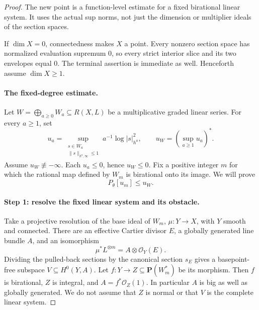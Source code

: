 \begin{proof}

The new point is a function-level estimate for a fixed birational linear
system.  It uses the actual sup norms, not just the dimension or
multiplier ideals of the section spaces.

If \(\dim X=0\), connectedness makes \(X\) a point.  Every nonzero
section space has normalized evaluation supremum \(0\), so every strict
interior slice and its two envelopes equal \(0\).  The terminal assertion
is immediate as well.  Henceforth assume \(\dim X\geq1\).

\paragraph{The fixed-degree estimate.}

Let \(W=\bigoplus_{a\geq0}W_a\subseteq R(X,L)\) be a multiplicative graded
linear series.  For every \(a\geq1\), set
\[
 u_a=\sup_{\substack{s\in W_a\\\|s\|_{h^a,\infty}\leq1}}
                   a^{-1}\log|s|_{h^a}^2,\qquad
 u_W=(\sup_{a\geq1}u_a)^*.
\]
Assume \(u_W\not\equiv-\infty\).  Each \(u_a\leq0\), hence \(u_W\leq0\).
Fix a positive integer \(m\) for which the rational map defined by \(W_m\)
is birational onto its image.  We will prove
\[
\tag{71.48c}\label{eq:pseff-filtration-fixed-degree-bound}
                         P_\theta[u_m]\leq u_W.
\]

\paragraph{Step 1: resolve the fixed linear system and its obstacle.}
Take a projective resolution of the base ideal of \(W_m\),
\(\mu:Y\to X\), with \(Y\) smooth and connected.  There are an effective
Cartier divisor \(E\), a globally generated line bundle \(A\), and an
isomorphism
\[
\tag{71.48d}\label{eq:pseff-filtration-resolved-bundle}
             \mu^*L^{\otimes m}=A\otimes\mathcal O_Y(E).
\]
Dividing the pulled-back sections by the canonical section \(s_E\)
gives a basepoint-free subspace \(V\subseteq H^0(Y,A)\).
Let \(f:Y\to Z\subseteq\mathbf P(W_m^*)\) be its morphism.
Then \(f\) is birational, \(Z\) is integral, and
\(A=f^*\mathcal O_Z(1)\).  In particular \(A\) is big as well as globally
generated.  We do not assume that \(Z\) is normal or that \(V\) is the
complete linear system.


\end{proof}
